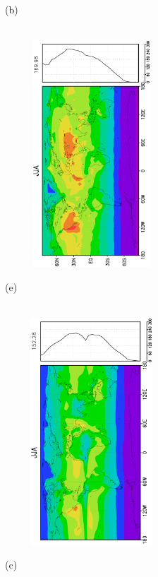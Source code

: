 \documentclass[12pt,a4paper,twoside,openright,headinclude,liststotoc,bibtotoc]{scrreprt}
\begin{document}
\begin{figure}[H]
{}
\parbox{8.5cm}{\hspace{0.50cm}\begin{scriptsize}(b)\end{scriptsize} \vspace{-0.7cm} \\
\includegraphics[height=8.5cm,width=6.5cm,angle=-90]
{eps/zonalysmsfcsolrad176JJA.eps}
}
\parbox{8.5cm}{\hspace{0.28cm}\begin{scriptsize}(e)\end{scriptsize} \vspace{-0.7cm} \\
\includegraphics[height=8.5cm,width=6.5cm,angle=-90]
{eps/zonalt21ysmsfcsolradJJA.eps}
}
\parbox{8.4cm}{\hspace{0.50cm}\begin{scriptsize}(c)\end{scriptsize} \vspace{-0.7cm} \\
}
\end{figure}
\end{document}
